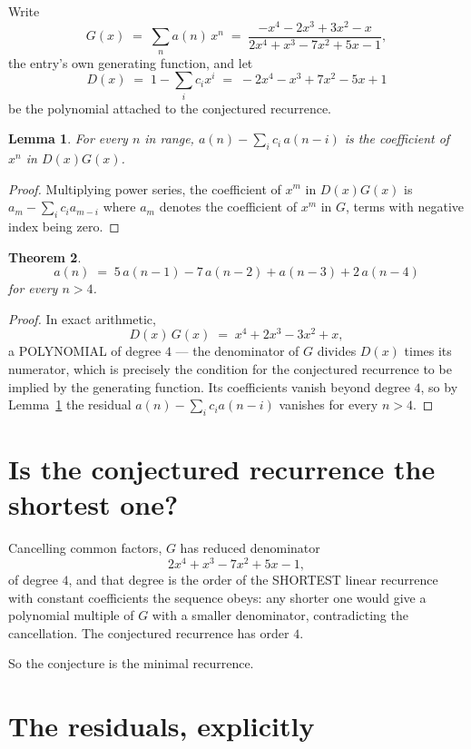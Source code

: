 \documentclass[11pt,a4paper]{article}
\theoremstyle{plain}
\newtheorem{theorem}{Theorem}
\newtheorem{lemma}[theorem]{Lemma}
\theoremstyle{definition}
\begin{document}
Write
\[
G(x)\;=\;\sum_{n}a(n)\,x^{n}\;=\;\frac{- x^{4} - 2 x^{3} + 3 x^{2} - x}{2 x^{4} + x^{3} - 7 x^{2} + 5 x - 1},
\]
the entry's own generating function, and let
\[
D(x)\;=\;1-\sum_i c_i x^{i}\;=\;- 2 x^{4} - x^{3} + 7 x^{2} - 5 x + 1
\]
be the polynomial attached to the conjectured recurrence.

\begin{lemma}\label{lem:key}
For every $n$ in range, $a(n)-\sum_i c_i\,a(n-i)$ is the coefficient of $x^{n}$ in
$D(x)G(x)$.
\end{lemma}

\begin{proof}
Multiplying power series, the coefficient of $x^{m}$ in $D(x)G(x)$ is
$a_m-\sum_i c_i a_{m-i}$ where $a_m$ denotes the coefficient of $x^{m}$ in $G$, terms with
negative index being zero.
\end{proof}

\begin{theorem}
\[
a(n)\;=\;5\,a(n-1) - 7\,a(n-2) + a(n-3) + 2\,a(n-4)
\]
for every $n>4$.
\end{theorem}

\begin{proof}
In exact arithmetic,
\[
D(x)\,G(x)\;=\;x^{4} + 2 x^{3} - 3 x^{2} + x,
\]
a POLYNOMIAL of degree $4$ --- the denominator of $G$ divides $D(x)$ times its numerator,
which is precisely the condition for the conjectured recurrence to be implied by the
generating function. Its coefficients vanish beyond degree $4$, so by
Lemma~\ref{lem:key} the residual $a(n)-\sum_ic_ia(n-i)$ vanishes for every
$n>4$.
\end{proof}

\section{Is the conjectured recurrence the shortest one?}

Cancelling common factors, $G$ has reduced denominator
\[
2 x^{4} + x^{3} - 7 x^{2} + 5 x - 1,
\]
of degree $4$, and that degree is the order of the SHORTEST linear recurrence with
constant coefficients the sequence obeys: any shorter one would give a polynomial multiple of
$G$ with a smaller denominator, contradicting the cancellation. The conjectured recurrence has
order $4$.

So the conjecture is the minimal recurrence.

\section{The residuals, explicitly}
\end{document}
